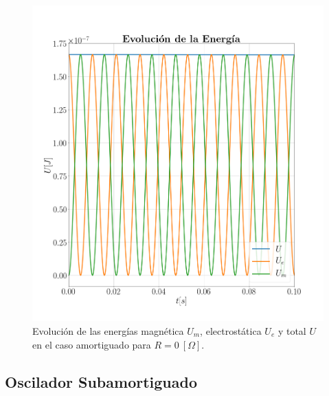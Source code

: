 \documentclass[journal]{IEEEtran}
\begin{document}
\begin{figure}[!htb]
    \centering
    \includegraphics[width=\linewidth,trim={40 70 70 70},clip]{energiaamortiguado.png}
    \caption{Evolución de las energías magnética $U_m$, electrostática $U_e$ y total $U$ en el caso amortiguado para $R=0~[\Omega]$.}
    \label{fig:intensidadamortiguado}
\end{figure}

\subsection{Oscilador Subamortiguado}
\label{subsec:osciladorsubamortiguado}
\end{document}

